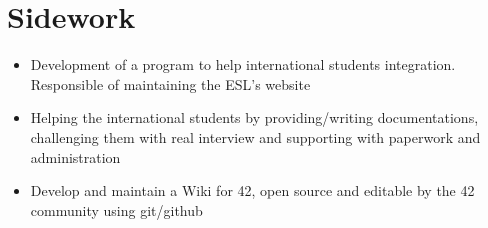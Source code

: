 \section{Sidework}

\begin{minipage}{.15\textwidth}
    \centerline{}
\end{minipage}%
\hspace{5mm}
\begin{minipage}{.9\textwidth}
    \raggedright
    \begin{minipage}[t]{.8\textwidth}
        \begin{itemize}
            \item Development of a program to help international students integration. Responsible of maintaining the ESL's website
            \item Helping the international students by providing/writing documentations, challenging them with real interview and supporting with paperwork and administration
        \end{itemize}
    \end{minipage}
\end{minipage}
\begin{minipage}{.15\textwidth}
    \centerline{}
\end{minipage}%
\hspace{5mm}
\begin{minipage}{.9\textwidth}
    \raggedright
    \begin{minipage}[t]{.8\textwidth}
        \begin{itemize}
            \item Develop and maintain a Wiki for 42, open source and editable by the 42 community using git/github
        \end{itemize}
    \end{minipage}
\end{minipage}
